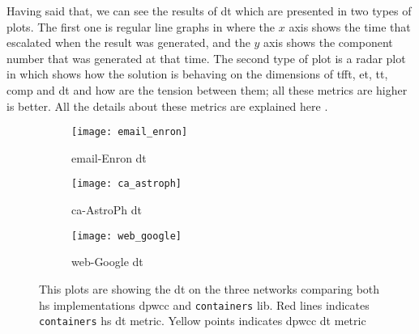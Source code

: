 Having said that, we can see the results of \acrshort{dt} which are presented in two types of plots. The first one is regular line graphs in where the $x$ axis shows the time that escalated when the result was generated, and the $y$ axis shows the component number that was generated at that time. 
The second type of plot is a radar plot in which shows how the solution is behaving 
on the dimensions of  \acrfull{tfft}, \acrfull{et}, \acrfull{tt}, \acrfull{comp} and \acrlong{dt} and how are the tension between them; all these metrics are higher is better. 
All the details about these metrics are explained here \cite{diefpaper}.

\begin{figure}[!htb]
    \centering
    \begin{subfigure}{0.33\textwidth}
     \texttt{[image: email\_enron]}
      \caption[{[PoC] \acrshort{dt} Results: email-Enron}]{email-Enron \acrshort{dt}}
      \label{fig:dief:1}
    \end{subfigure}%
    \begin{subfigure}{0.33\textwidth}
     \texttt{[image: ca\_astroph]}
      \caption[{[PoC] \acrshort{dt} Results: ca-AstroPh}]{ca-AstroPh \acrshort{dt}}
      \label{fig:dief:2}
    \end{subfigure}%
    \begin{subfigure}{0.33\textwidth}
     \texttt{[image: web\_google]}
      \caption[{[PoC] \acrshort{dt} Results: web-Google}]{web-Google \acrshort{dt}}
      \label{fig:dief:3}
    \end{subfigure}
    \caption[{[PoC] \acrshort{dt} Metrics}]{This plots are showing the \acrshort{dt} on the three networks comparing both \acrshort{hs} implementations \acrshort{dpwcc} and \texttt{containers} lib. Red lines indicates \texttt{containers} \acrshort{hs} \acrshort{dt} metric. Yellow points indicates \acrshort{dpwcc} \acrshort{dt} metric}
\end{figure}

